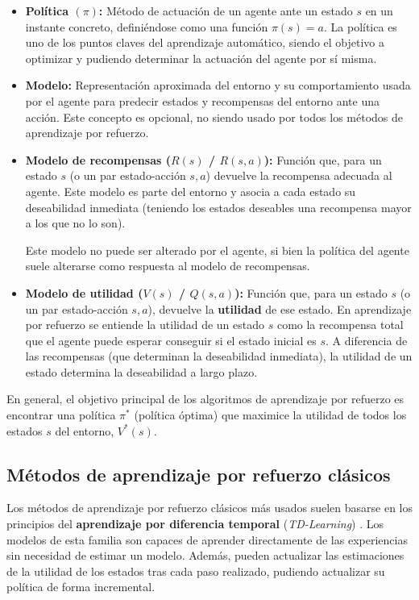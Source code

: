 \begin{itemize}
\item \textbf{Política $(\pi)$:} Método de actuación de un agente ante un estado $s$ en un instante concreto, definiéndose como una función $\pi(s) = a$. La política es uno de los puntos claves del aprendizaje automático, siendo el objetivo a optimizar y pudiendo determinar la actuación del agente por sí misma.
\item \textbf{Modelo:} Representación aproximada del entorno y su comportamiento usada por el agente para predecir estados y recompensas del entorno ante una acción. Este concepto es opcional, no siendo usado por todos los métodos de aprendizaje por refuerzo.
\item \textbf{Modelo de recompensas ($R(s)$ / $R(s,a)$):} Función que, para un estado $s$ (o un par estado-acción $s, a$) devuelve la recompensa adecuada al agente. Este modelo es parte del entorno y asocia a cada estado su deseabilidad inmediata (teniendo los estados deseables una recompensa mayor a los que no lo son).

Este modelo no puede ser alterado por el agente, si bien la política del agente suele alterarse como respuesta al modelo de recompensas.

\item \textbf{Modelo de utilidad ($V(s)$ / $Q(s,a)$):} Función que, para un estado $s$ (o un par estado-acción $s,a$), devuelve la \textbf{utilidad} de ese estado. En aprendizaje por refuerzo se entiende la utilidad de un estado $s$ como la recompensa total que el agente puede esperar conseguir si el estado inicial es $s$. A diferencia de las recompensas (que determinan la deseabilidad inmediata), la utilidad de un estado determina la deseabilidad a largo plazo.
\end{itemize}

En general, el objetivo principal de los algoritmos de aprendizaje por refuerzo es encontrar una política $\pi^*$ (política óptima) que maximice la utilidad de todos los estados $s$ del entorno, $V^*(s)$.

\subsection{Métodos de aprendizaje por refuerzo clásicos}

Los métodos de aprendizaje por refuerzo clásicos más usados suelen basarse en los principios del \textbf{aprendizaje por diferencia temporal} (\textit{TD-Learning}) \cite{Sutton1998}. Los modelos de esta familia son capaces de aprender directamente de las experiencias sin necesidad de estimar un modelo. Además, pueden actualizar las estimaciones de la utilidad de los estados tras cada paso realizado, pudiendo actualizar su política de forma incremental.

